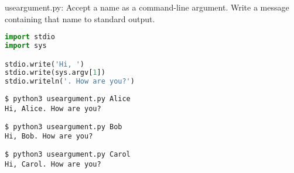 \documentclass[8pt,a4paper,compress]{beamer}
\begin{document}
\begin{frame}[fragile]
\pause

\begin{framed}
\tiny useargument.py: Accept a name as a command-line argument. Write a message containing that name to standard output.
\end{framed}

\begin{lstlisting}[language=Python,style=focusin]
import stdio
import sys

stdio.write('Hi, ')
stdio.write(sys.argv[1])
stdio.writeln('. How are you?')
\end{lstlisting}

\pause\bigskip

\begin{lstlisting}[language={},style=focusin]
$ python3 useargument.py Alice
Hi, Alice. How are you?
\end{lstlisting}

\pause\bigskip

\begin{lstlisting}[language={},style=focusin]
$ python3 useargument.py Bob
Hi, Bob. How are you?
\end{lstlisting}

\pause\bigskip

\begin{lstlisting}[language={},style=focusin]
$ python3 useargument.py Carol
Hi, Carol. How are you?
\end{lstlisting}
\end{frame}
\end{document}
